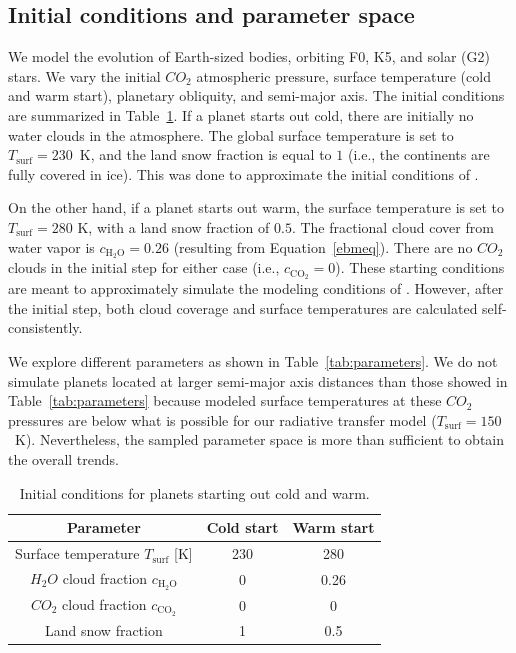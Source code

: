 \documentclass[fleqn,usenatbib]{mnras}
\begin{document}
\subsection{Initial conditions and parameter space}
We model the evolution of Earth-sized bodies, orbiting  F0, K5, and solar (G2) stars. We vary the initial $CO_{\mathrm{2}}$ atmospheric pressure, surface temperature (cold and warm start), planetary obliquity, and semi-major axis. The initial conditions are summarized in Table~\ref{tab:ic}. If a planet starts out cold, there are initially no water clouds in the atmosphere. The global surface temperature is set to $T_{\mathrm{surf}}=230$~K, and the land snow fraction is equal to $1$ (i.e., the continents are fully covered in ice). This was done to approximate the initial conditions of \citet{Turbet2017}.

On the other hand, if a planet starts out warm, the surface temperature is set to $T_{\mathrm{surf}}=280$ K, with a land snow fraction of $0.5$. The fractional cloud cover from water vapor is $c_{\mathrm{H_{\mathrm{2}}O}}=0.26$ (resulting from Equation~\ref{ebmeq}). 
There are no $CO_{\mathrm{2}}$ clouds in the initial step for either case (i.e., $c_{\mathrm{CO_{\mathrm{2}}}}=0$). These starting conditions are meant to approximately simulate the modeling conditions of \citet{Turbet2017}. However, after the initial step, both cloud coverage and surface temperatures are calculated self-consistently. 

We explore different parameters as shown in Table~\ref{tab:parameters}. We do not simulate planets located at larger semi-major axis distances than those showed in Table~\ref{tab:parameters} because modeled surface temperatures at these $CO_{\mathrm{2}}$ pressures are below what is possible for our radiative transfer model ($T_{\mathrm{surf}}=150$~K). Nevertheless, the sampled parameter space is more than sufficient to obtain the overall trends.

\begin{table}
	\centering
	\caption{Initial conditions for planets starting out cold and warm.}
	\label{tab:ic}
	\begin{tabular}{ccc} 
		\hline
		Parameter & \textbf{Cold start} & \textbf{Warm start} \\
		\hline
		Surface temperature $T_{\mathrm{surf}}$ [K] & 230 & 280 \\
		$H_{\mathrm{2}}O$ cloud fraction $c_{\mathrm{H_{\mathrm{2}}O}}$ & 0 & 0.26  \\
		$CO_{\mathrm{2}}$ cloud fraction $c_{\mathrm{CO_{\mathrm{2}}}}$ & 0 & 0 \\
		Land snow fraction & 1 & 0.5 \\
		\hline
	\end{tabular}
\end{table}
\end{document}
